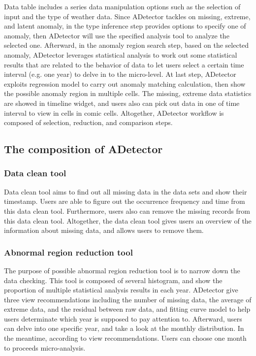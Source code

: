\documentclass{vgtc}                          %
\begin{document}
Data table includes a series data manipulation options such as the selection of input and the type of weather data. Since ADetector tackles on missing, extreme, and latent anomaly, in the type inference step provides options to specify one of anomaly, then ADetector will use the specified analysis tool to analyze the selected one. Afterward, in the anomaly region search step, based on the selected anomaly, ADetector leverages statistical analysis to work out some statistical results that are related to the behavior of data to let users select a certain time interval (e.g. one year) to delve in to the micro-level. At last step, ADetector exploits regression model to carry out anomaly matching calculation, then show the possible anomaly region in multiple cells. The missing, extreme data statistics are showed in timeline widget, and users also can pick out data in one of time interval to view in cells in comic cells. Altogether, ADetector workflow is composed of selection, reduction, and comparison steps.

\subsection{The composition of ADetector}
\subsubsection{Data clean tool}

Data clean tool aims to find out all missing data in the data sets and show their timestamp. Users are able to figure out the occurrence frequency and time from this data clean tool. Furthermore, users also can remove the missing records from this data clean tool. Altogether, the data clean tool gives users an overview of the information about missing data, and allows users to remove them. 

\subsubsection{Abnormal region reduction tool}

The purpose of possible abnormal region reduction tool is to narrow down the data checking. This tool is composed of several histogram, and show the proportion of multiple statistical analysis results in each year. ADetector give three view recommendations including the number of missing data, the average of extreme data, and the residual between raw data, and fitting curve model to help users determinate which year is supposed to pay attention to. Afterward, users can delve into one specific year, and take a look at the monthly distribution. In the meantime, according to view recommendations. Users can choose one month to proceeds micro-analysis.
\end{document}
